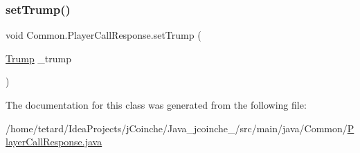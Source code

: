 \mbox{\label{classCommon_1_1PlayerCallResponse_aa34a0f910c4f9a03e9fe89b3777d74c0}} 
\subsubsection{\texorpdfstring{set\+Trump()}{setTrump()}}
{\footnotesize\ttfamily void Common.\+Player\+Call\+Response.\+set\+Trump (\begin{DoxyParamCaption}\item[{\mbox{\hyperlink{enumCommon_1_1Trump}{Trump}}}]{\+\_\+trump }\end{DoxyParamCaption})\hspace{0.3cm}{\ttfamily [inline]}}



The documentation for this class was generated from the following file\+:\begin{DoxyCompactItemize}
\item 
/home/tetard/\+Idea\+Projects/j\+Coinche/\+Java\+\_\+jcoinche\+\_/src/main/java/\+Common/\mbox{\hyperlink{PlayerCallResponse_8java}{Player\+Call\+Response.\+java}}\end{DoxyCompactItemize}
